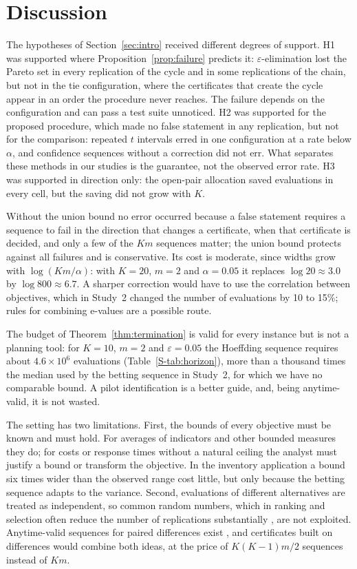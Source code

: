 \section{Discussion}\label{sec:discussion}

The hypotheses of Section~\ref{sec:intro} received different degrees of support. H1 was supported where Proposition~\ref{prop:failure} predicts it: $\varepsilon$-elimination lost the Pareto set in every replication of the cycle and in some replications of the chain, but not in the tie configuration, where the certificates that create the cycle appear in an order the procedure never reaches. The failure depends on the configuration and can pass a test suite unnoticed. H2 was supported for the proposed procedure, which made no false statement in any replication, but not for the comparison: repeated $t$ intervals erred in one configuration at a rate below $\alpha$, and confidence sequences without a correction did not err. What separates these methods in our studies is the guarantee, not the observed error rate. H3 was supported in direction only: the open-pair allocation saved evaluations in every cell, but the saving did not grow with $K$.

Without the union bound no error occurred because a false statement requires a sequence to fail in the direction that changes a certificate, when that certificate is decided, and only a few of the $Km$ sequences matter; the union bound protects against all failures and is conservative. Its cost is moderate, since widths grow with $\log(Km/\alpha)$: with $K=20$, $m=2$ and $\alpha=0.05$ it replaces $\log 20\approx3.0$ by $\log 800\approx6.7$. A sharper correction would have to use the correlation between objectives, which in Study~2 changed the number of evaluations by 10 to 15\%; rules for combining e-values \citep{vovk2021} are a possible route.

The budget of Theorem~\ref{thm:termination} is valid for every instance but is not a planning tool: for $K=10$, $m=2$ and $\varepsilon=0.05$ the Hoeffding sequence requires about $4.6\times10^6$ evaluations (Table~\ref{S-tab:horizon}), more than a thousand times the median used by the betting sequence in Study~2, for which we have no comparable bound. A pilot identification is a better guide, and, being anytime-valid, it is not wasted.

The setting has two limitations. First, the bounds of every objective must be known and must hold. For averages of indicators and other bounded measures they do; for costs or response times without a natural ceiling the analyst must justify a bound or transform the objective. In the inventory application a bound six times wider than the observed range cost little, but only because the betting sequence adapts to the variance. Second, evaluations of different alternatives are treated as independent, so common random numbers, which in ranking and selection often reduce the number of replications substantially \citep{hunter2019}, are not exploited. Anytime-valid sequences for paired differences exist \citep{seqbench}, and certificates built on differences would combine both ideas, at the price of $K(K-1)m/2$ sequences instead of $Km$.

